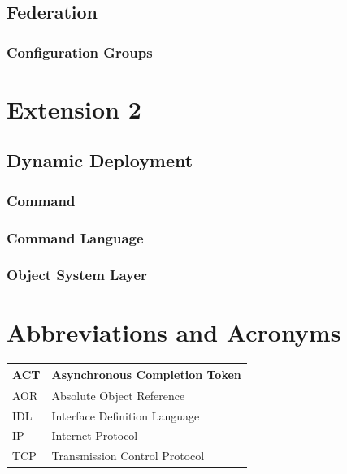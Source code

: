 \documentclass[a4paper]{article}
\begin{document}
\subsection{Federation}
\subsubsection{Configuration Groups}

\section{Extension 2}
\subsection{Dynamic Deployment}
\subsubsection{Command}
\subsubsection{Command Language}
\subsubsection{Object System Layer}

\section{Abbreviations and Acronyms}

	\begin{tabular}{|l|l|}
	\hline
	ACT & Asynchronous Completion Token\\
	\hline
	AOR & Absolute Object Reference\\
	\hline
	IDL & Interface Definition Language\\
	\hline
	IP & Internet Protocol\\
	\hline
	TCP & Transmission Control Protocol\\
	\hline
	\end{tabular}

\newpage


\end{document}
